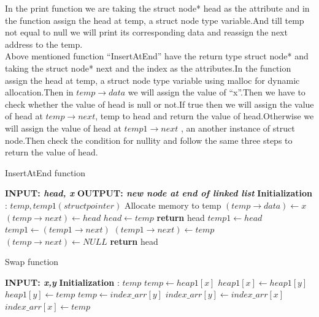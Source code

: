\documentclass[conference]{IEEEtran}
\begin{document}
In the print function we are taking the struct node* head as the attribute and in the function assign the head at temp, a struct node type variable.And till temp not equal to null we will print its corresponding data and reassign the next address to the temp.\\

Above mentioned function “InsertAtEnd” have the return type struct node* and taking the struct node* next and the index as the attributes.In the function assign the head at temp, a struct node type variable using malloc for dynamic allocation.Then in $temp \rightarrow data$ we will assign the value of “x”.Then we have to check whether the value of head is null or not.If true then we will assign the value of head at $temp \rightarrow next$, temp to head and return the value of head.Otherwise we will assign the value of head at $temp1 \rightarrow next$ , an another instance of struct node.Then check the condition for nullity and follow the same three steps to return the value of head.\\

\begin{algorithm}[H]
\caption{InsertAtEnd function}
\end{algorithm}
\begin{algorithmic}[1]
\STATE \textbf{INPUT: \textit{head, x }}
\STATE \textbf{OUTPUT: \textit{new node at end of linked list}}
\STATE \textbf{Initialization} : $ temp ,temp1(struct pointer)$ 
\STATE Allocate memory to temp
\STATE $(temp \rightarrow data) \gets x$
	\STATE $(temp \rightarrow next) \gets head$
	\STATE $head \gets temp $
	\STATE \textbf{return} head
\ELSE
	\STATE $temp1 \gets head$
    	\STATE $temp1 \gets (temp1 \rightarrow next)$
     \ENDWHILE   
        \STATE $(temp1 \rightarrow next) \gets temp$
        \STATE $(temp \rightarrow next) \gets NULL$
        \STATE \textbf{return} head
\ENDIF
\end{algorithmic}

\begin{algorithm}[H]
\caption{Swap function}
\end{algorithm}
\begin{algorithmic}[1]
\STATE \textbf{INPUT: \textit{ x,y }}
\STATE \textbf{Initialization} : $ temp$ 
\STATE $temp \gets heap1[x]$
\STATE $heap1[x] \gets heap1[y]$
\STATE $heap1[y] \gets  temp$
\STATE $temp \gets index\_arr[y]$
\STATE $index\_arr[y] \gets index\_arr[x]$
\STATE $index\_arr[x] \gets temp$
\end{algorithmic}
\end{document}
